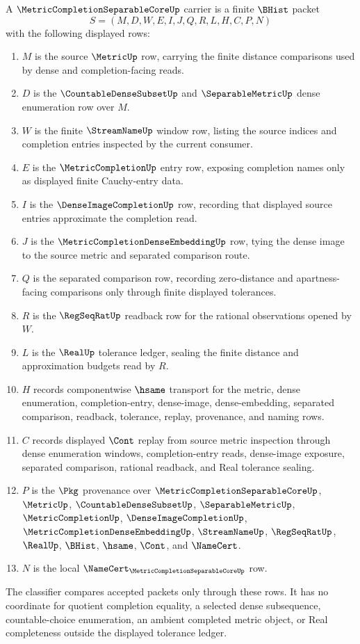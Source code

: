 \begin{definition}
\label{def:metric-completion-separable-core-carrier}
A $\MetricCompletionSeparableCoreUp$ carrier is a finite $\BHist$ packet
$$
S=(M,D,W,E,I,J,Q,R,L,H,C,P,N)
$$
with the following displayed rows:
\begin{enumerate}
\item $M$ is the source $\MetricUp$ row, carrying the finite distance comparisons used by dense and completion-facing reads.
\item $D$ is the $\CountableDenseSubsetUp$ and $\SeparableMetricUp$ dense enumeration row over $M$.
\item $W$ is the finite $\StreamNameUp$ window row, listing the source indices and completion entries inspected by the current consumer.
\item $E$ is the $\MetricCompletionUp$ entry row, exposing completion names only as displayed finite Cauchy-entry data.
\item $I$ is the $\DenseImageCompletionUp$ row, recording that displayed source entries approximate the completion read.
\item $J$ is the $\MetricCompletionDenseEmbeddingUp$ row, tying the dense image to the source metric and separated comparison route.
\item $Q$ is the separated comparison row, recording zero-distance and apartness-facing comparisons only through finite displayed tolerances.
\item $R$ is the $\RegSeqRatUp$ readback row for the rational observations opened by $W$.
\item $L$ is the $\RealUp$ tolerance ledger, sealing the finite distance and approximation budgets read by $R$.
\item $H$ records componentwise $\hsame$ transport for the metric, dense enumeration, completion-entry, dense-image, dense-embedding, separated comparison, readback, tolerance, replay, provenance, and naming rows.
\item $C$ records displayed $\Cont$ replay from source metric inspection through dense enumeration windows, completion-entry reads, dense-image exposure, separated comparison, rational readback, and Real tolerance sealing.
\item $P$ is the $\Pkg$ provenance over $\MetricCompletionSeparableCoreUp$, $\MetricUp$, $\CountableDenseSubsetUp$, $\SeparableMetricUp$, $\MetricCompletionUp$, $\DenseImageCompletionUp$, $\MetricCompletionDenseEmbeddingUp$, $\StreamNameUp$, $\RegSeqRatUp$, $\RealUp$, $\BHist$, $\hsame$, $\Cont$, and $\NameCert$.
\item $N$ is the local $\NameCert_{\MetricCompletionSeparableCoreUp}$ row.
\end{enumerate}
The classifier compares accepted packets only through these rows. It has no coordinate for quotient completion equality, a selected dense subsequence, countable-choice enumeration, an ambient completed metric object, or Real completeness outside the displayed tolerance ledger.
\end{definition}

